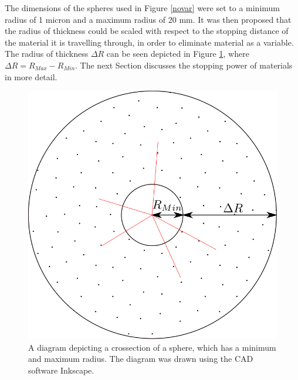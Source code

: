 \documentclass[12pt,a4paper]{article}
\begin{document}
\noindent The dimensions of the spheres used in Figure \ref{novar} were set to a minimum radius of 1 micron and a maximum radius of 20 mm. It was then proposed that the radius of thickness could be scaled with respect to the stopping distance of the material it is travelling through, in order to eliminate material as a variable. The radius of thickness $\Delta R$ can be seen depicted in Figure \ref{deltar}, where $\Delta R = R_{Max} - R_{Min}$. The next Section discusses the stopping power of materials in more detail.

\begin{figure}[h!]
\centering
\includegraphics[scale=0.2]{Images//Materials//RMAX.png}
\caption[width=\columnwidth]{A diagram depicting a crossection of a sphere, which has a minimum and maximum radius. The diagram was drawn using the CAD software Inkscape.}
\label{deltar}
\end{figure}


\newpage
\end{document}
